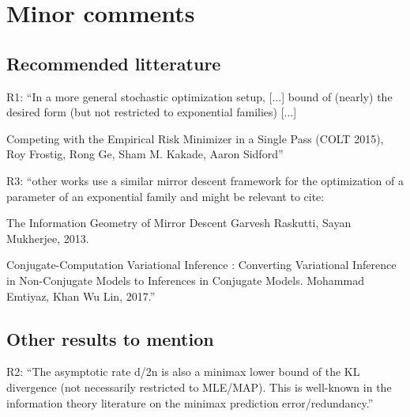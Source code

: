 
\section*{Minor comments}

\subsection*{Recommended litterature}

R1:
``In a more general stochastic optimization setup, [...]  bound of (nearly) the desired form (but not restricted to exponential families) [...] 

Competing with the Empirical Risk Minimizer in a Single Pass (COLT 2015), Roy Frostig, Rong Ge, Sham M. Kakade, Aaron Sidford''

R3:
``other works use a similar mirror descent framework for the optimization of a parameter of an exponential family and might be relevant to cite:

The Information Geometry of Mirror Descent
Garvesh Raskutti, Sayan Mukherjee, 2013.

Conjugate-Computation Variational Inference : Converting Variational Inference in Non-Conjugate Models to Inferences in Conjugate Models. Mohammad Emtiyaz, Khan Wu Lin, 2017.'' 


\subsection*{Other results to mention}

R2:
``The asymptotic rate d/2n is also a minimax lower bound of the KL divergence (not necessarily restricted to MLE/MAP). This is well-known in the information theory literature on the minimax prediction error/redundancy.''


